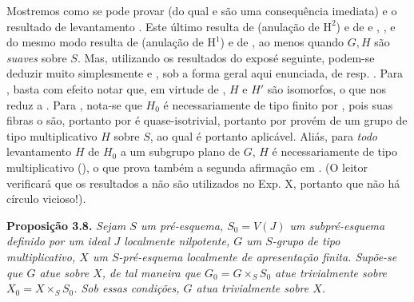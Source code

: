 Mostremos como se pode provar
 (do qual
 e
 são uma consequência
imediata) e o resultado de levantamento
. Este último resulta
de  (anulação de
\(\mathrm H^2\)) e de 
e ,
, e do mesmo
modo  resulta de
 (anulação de \(\mathrm H^1\))
e de ,
ao menos quando \(G,H\) são \emph{suaves} sobre \(S\). Mas,
utilizando os resultados do exposé seguinte, podem-se deduzir muito
simplesmente  e
, sob a forma geral
aqui enunciada, de  resp.
. Para
, basta com efeito
notar que, em virtude de ,
\(H\) e \(H'\) são isomorfos, o que nos reduz a
. Para
, nota-se que \(H_0\)
é necessariamente de tipo finito por
, pois suas
fibras o são, portanto por 
é quase-isotrivial, portanto por
 provém de um grupo de
tipo multiplicativo \(H\) sobre \(S\), ao qual
 é portanto aplicável. Aliás,
para \emph{todo} levantamento \(H\) de \(H_0\) a um subgrupo plano
de \(G\), \(H\) é necessariamente de tipo multiplicativo
(), o que prova também a
segunda afirmação em
. (O leitor verificará
que os resultados  a
 não são utilizados
no Exp. X, portanto que não há círculo vicioso!).

\medskip
\noindent{}\textbf{Proposição 3.8.}
\textit{Sejam \(S\) um pré-esquema, \(S_0=V(J)\) um subpré-esquema
definido por um ideal \(J\) localmente nilpotente, \(G\) um
\(S\)-grupo de tipo multiplicativo, \(X\) um \(S\)-pré-esquema
localmente de apresentação finita. Supõe-se que \(G\) atue sobre
\(X\), de tal maneira que \(G_0=G\times_S S_0\) atue trivialmente
sobre \(X_0=X\times_S S_0\). Sob essas condições, \(G\) atua
trivialmente sobre \(X\).}

